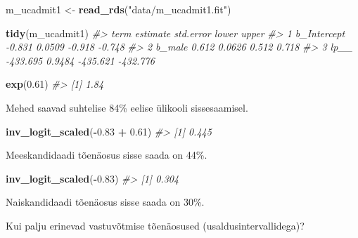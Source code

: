 \documentclass[]{book}
\newenvironment{Shaded}{\begin{snugshade}}{\end{snugshade}}
\newcommand{\CommentTok}[1]{\textcolor[rgb]{0.56,0.35,0.01}{\textit{#1}}}
\newcommand{\FloatTok}[1]{\textcolor[rgb]{0.00,0.00,0.81}{#1}}
\newcommand{\KeywordTok}[1]{\textcolor[rgb]{0.13,0.29,0.53}{\textbf{#1}}}
\newcommand{\NormalTok}[1]{#1}
\newcommand{\OperatorTok}[1]{\textcolor[rgb]{0.81,0.36,0.00}{\textbf{#1}}}
\newcommand{\StringTok}[1]{\textcolor[rgb]{0.31,0.60,0.02}{#1}}
\begin{document}
\begin{Shaded}
\begin{Highlighting}[]
\NormalTok{m_ucadmit1 <-}\StringTok{ }\KeywordTok{read_rds}\NormalTok{(}\StringTok{"data/m_ucadmit1.fit"}\NormalTok{)}
\end{Highlighting}
\end{Shaded}

\begin{Shaded}
\begin{Highlighting}[]
\KeywordTok{tidy}\NormalTok{(m_ucadmit1)}
\CommentTok{#>          term estimate std.error    lower    upper}
\CommentTok{#> 1 b_Intercept   -0.831    0.0509   -0.918   -0.748}
\CommentTok{#> 2      b_male    0.612    0.0626    0.512    0.718}
\CommentTok{#> 3        lp__ -433.695    0.9484 -435.621 -432.776}
\end{Highlighting}
\end{Shaded}

\begin{Shaded}
\begin{Highlighting}[]
\KeywordTok{exp}\NormalTok{(}\FloatTok{0.61}\NormalTok{)}
\CommentTok{#> [1] 1.84}
\end{Highlighting}
\end{Shaded}

Mehed saavad suhtelise 84\% eelise ülikooli sissesaamisel.

\begin{Shaded}
\begin{Highlighting}[]
\KeywordTok{inv_logit_scaled}\NormalTok{(}\OperatorTok{-}\FloatTok{0.83} \OperatorTok{+}\StringTok{ }\FloatTok{0.61}\NormalTok{)}
\CommentTok{#> [1] 0.445}
\end{Highlighting}
\end{Shaded}

Meeskandidaadi tõenäosus sisse saada on 44\%.

\begin{Shaded}
\begin{Highlighting}[]
\KeywordTok{inv_logit_scaled}\NormalTok{(}\OperatorTok{-}\FloatTok{0.83}\NormalTok{)}
\CommentTok{#> [1] 0.304}
\end{Highlighting}
\end{Shaded}

Naiskandidaadi tõenäosus sisse saada on 30\%.

Kui palju erinevad vastuvõtmise tõenäosused (usaldusintervallidega)?
\end{document}
